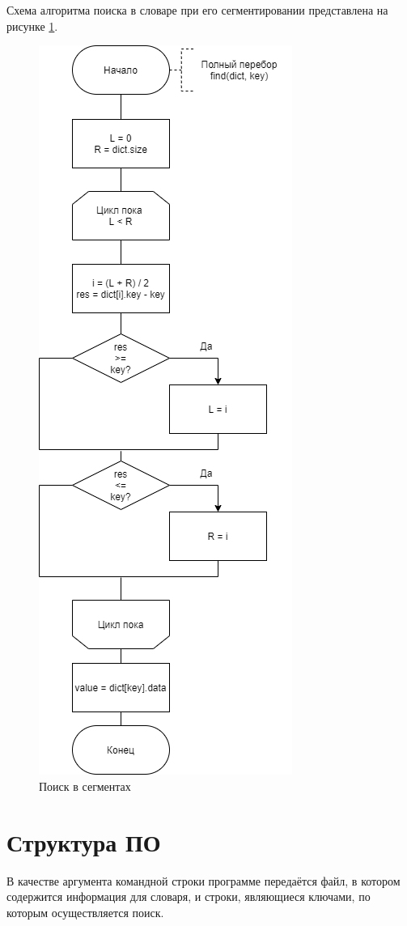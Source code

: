 \documentclass[a4paper,oneside,14pt]{extreport}
\begin{document}
Схема алгоритма поиска в словаре при его сегментировании представлена на рисунке \ref{fig:segment}.
\begin{figure}[H]
	\centering
	\includegraphics[scale = 0.53]{images/bin_search.png}
	\caption{Поиск в сегментах}
	\label{fig:segment}
\end{figure}

\section{Структура ПО}
В качестве аргумента командной строки программе передаётся файл, в котором содержится информация для словаря, и строки, являющиеся ключами, по которым осуществляется поиск.
\end{document}
